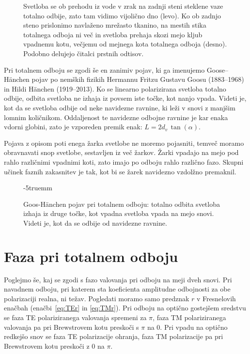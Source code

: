 \begin{figure}[ht]
\caption{Svetloba se ob prehodu iz vode v zrak na zadnji steni steklene vaze 
totalno odbije, zato tam vidimo vijolično dno (levo). Ko ob zadnjo steno prislonimo
navlaženo mrežasto tkanino, na mestih stika totalnega odboja ni več in svetloba prehaja
skozi mejo kljub vpadnemu kotu, večjemu od mejnega kota totalnega odboja (desno).
Podobno delujejo čitalci prstnih odtisov.}
\label{fig:04_FTIRfoto}

\end{figure}
\begin{remark}
Pri totalnem odboju se zgodi še en zanimiv pojav, ki ga imenujemo Goose--H\"anchen pojav 
po nemških fizikih Hermannu Fritzu Gustavu Goosu (1883--1968) in Hildi H\"anchen (1919--2013).
Ko se linearno polarizirana svetloba totalno odbije, odbita svetloba ne izhaja iz 
povsem iste točke, kot nanjo vpada. Videti je, kot da se svetloba odbije od neke 
navidezne ravnine, ki leži v snovi z manjšim lomnim količnikom. 
Oddaljenost te navidezne odbojne ravnine je kar enaka vdorni globini, 
zato je vzporeden premik enak: $L = 2d_v\,\tan(\alpha)$.

Pojava z opisom poti enega žarka svetlobe ne moremo pojasniti, temveč moramo
obravnavati snop svetlobe, sestavljen iz več žarkov. Žarki vpadajo na mejo pod rahlo
različnimi vpadnimi koti, zato imajo po odboju rahlo različno fazo. Skupni 
učinek faznih zakasnitev je tak, kot bi se žarek navidezno vzdolžno premaknil. 
\begin{figure}[ht]
\centering
\def\svgwidth{70truemm} 

\caption{Goos-H\"anchen pojav pri totalnem odboju: totalno odbita svetloba izhaja iz druge točke, 
kot vpadna svetloba vpada na mejo snovi. Videti je, kot da se odbije od navidezne ravnine.}
\label{fig:04_Goos}
\vglue-5truemm\end{figure}
\end{remark}

\section{Faza pri totalnem odboju}
Poglejmo še, kaj se zgodi s fazo valovanja pri odboju na meji dveh snovi. 
Pri navadnem odboju, pri katerem sta koeficienta
amplitudne odbojnosti za obe polarizaciji realna, ni težav. 
Pogledati moramo samo predznak $r$ v Fresnelovih enačbah (enačbi~\ref{eq:TEr} 
in \ref{eq:TMr}). Pri odboju na 
optično gostejšem sredstvu se faza TE polariziranega valovanja 
spremeni za $\pi$, faza TM polariziranega
valovanja pa pri Brewstrovem kotu preskoči s $\pi$ na 0. 
Pri vpadu na optično redkejšo snov se faza
TE polarizacije ohranja, faza TM polarizacije pa pri 
Brewstrovem kotu preskoči z 0 na $\pi$.  

